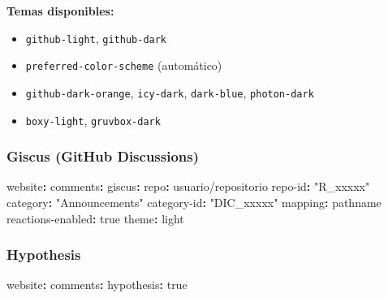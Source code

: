 \documentclass[
  doc,
  floatsintext,
  longtable,
  a4paper,
  nolmodern,
  notxfonts,
  notimes,
  12pt,
  colorlinks=true,linkcolor=blue,citecolor=blue,urlcolor=blue]{apa7}
\newenvironment{Shaded}{\begin{snugshade}}{\end{snugshade}}
\newcommand{\AttributeTok}[1]{\textcolor[rgb]{0.40,0.45,0.13}{#1}}
\newcommand{\CharTok}[1]{\textcolor[rgb]{0.13,0.47,0.30}{#1}}
\newcommand{\FunctionTok}[1]{\textcolor[rgb]{0.28,0.35,0.67}{#1}}
\newcommand{\KeywordTok}[1]{\textcolor[rgb]{0.00,0.23,0.31}{\textbf{#1}}}
\newcommand{\StringTok}[1]{\textcolor[rgb]{0.13,0.47,0.30}{#1}}
\providecommand{\tightlist}{%
  \setlength{\itemsep}{0pt}\setlength{\parskip}{0pt}}
\begin{document}
\textbf{Temas disponibles:}

\begin{itemize}
\tightlist
\item
  \texttt{github-light}, \texttt{github-dark}
\item
  \texttt{preferred-color-scheme} (automático)
\item
  \texttt{github-dark-orange}, \texttt{icy-dark}, \texttt{dark-blue},
  \texttt{photon-dark}
\item
  \texttt{boxy-light}, \texttt{gruvbox-dark}
\end{itemize}

\subsubsection{Giscus (GitHub
Discussions)}\label{giscus-github-discussions}

\begin{Shaded}
\begin{Highlighting}[]
\FunctionTok{website}\KeywordTok{:}
\AttributeTok{  }\FunctionTok{comments}\KeywordTok{:}
\AttributeTok{    }\FunctionTok{giscus}\KeywordTok{:}
\AttributeTok{      }\FunctionTok{repo}\KeywordTok{:}\AttributeTok{ usuario/repositorio}
\AttributeTok{      }\FunctionTok{repo{-}id}\KeywordTok{:}\AttributeTok{ }\StringTok{"R\_xxxxx"}
\AttributeTok{      }\FunctionTok{category}\KeywordTok{:}\AttributeTok{ }\StringTok{"Announcements"}
\AttributeTok{      }\FunctionTok{category{-}id}\KeywordTok{:}\AttributeTok{ }\StringTok{"DIC\_xxxxx"}
\AttributeTok{      }\FunctionTok{mapping}\KeywordTok{:}\AttributeTok{ pathname}
\AttributeTok{      }\FunctionTok{reactions{-}enabled}\KeywordTok{:}\AttributeTok{ }\CharTok{true}
\AttributeTok{      }\FunctionTok{theme}\KeywordTok{:}\AttributeTok{ light}
\end{Highlighting}
\end{Shaded}

\subsubsection{Hypothesis}\label{hypothesis}

\begin{Shaded}
\begin{Highlighting}[]
\FunctionTok{website}\KeywordTok{:}
\AttributeTok{  }\FunctionTok{comments}\KeywordTok{:}
\AttributeTok{    }\FunctionTok{hypothesis}\KeywordTok{:}\AttributeTok{ }\CharTok{true}
\end{Highlighting}
\end{Shaded}
\end{document}
